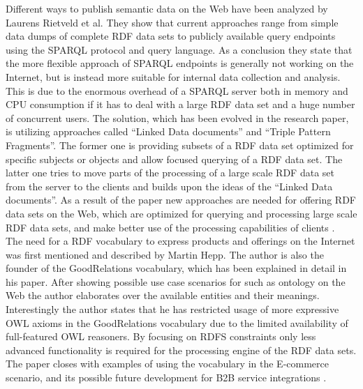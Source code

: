 Different ways to publish semantic data on the Web have been analyzed by Laurens Rietveld et al. They show that current approaches range from simple data dumps of complete \gls{RDF} data sets to publicly available query endpoints using the \gls{SPARQL} protocol and query language. As a conclusion they state that the more flexible approach of \gls{SPARQL} endpoints is generally not working on the Internet, but is instead more suitable for internal data collection and analysis. This is due to the enormous overhead of a \gls{SPARQL} server both in memory and CPU consumption if it has to deal with a large \gls{RDF} data set and a huge number of concurrent users. The solution, which has been evolved in the research paper, is utilizing approaches called ``Linked Data documents'' and ``Triple Pattern Fragments''. The former one is providing subsets of a \gls{RDF} data set optimized for specific subjects or objects and allow focused querying of a \gls{RDF} data set. The latter one tries to move parts of the processing of a large scale \gls{RDF} data set from the server to the clients and builds upon the ideas of the ``Linked Data documents''. As a result of the paper new approaches are needed for offering \gls{RDF} data sets on the Web, which are optimized for querying and processing large scale \gls{RDF} data sets, and make better use of the processing capabilities of clients \citep{rietveld2015linked}. \\

The need for a \gls{RDF} vocabulary to express products and offerings on the Internet was first mentioned and described by Martin Hepp. The author is also the founder of the GoodRelations vocabulary, which has been explained in detail in his paper. After showing possible use case scenarios for such as ontology on the Web the author elaborates over the available entities and their meanings. Interestingly the author states that he has restricted usage of more expressive \gls{OWL} axioms in the GoodRelations vocabulary due to the limited availability of full-featured \gls{OWL} reasoners. By focusing on \gls{RDFS} constraints only less advanced functionality is required for the processing engine of the \gls{RDF} data sets. The paper closes with examples of using the vocabulary in the \gls{E-commerce} scenario, and its possible future development for \gls{B2B} service integrations \citep{hepp2008goodrelations}. \\

